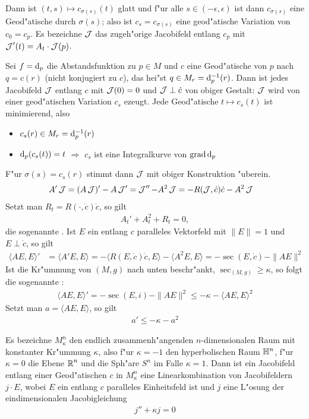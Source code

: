 Dann ist $(t, s) \mapsto c_{\sigma(s)}(t)$ glatt und f"ur alle $s \in (-\epsilon, \epsilon)$ ist dann $c_{\sigma(s)}$ eine Geod"atische durch $\sigma(s)$; also ist $c_s = c_{\sigma(s)}$ eine geod"atische Variation von $c_0 = c_p$.
Es bezeichne $\operatorname{\mathcal{J}}$ das zugeh"orige Jacobifeld entlang $c_p$ mit $\operatorname{\mathcal{J}}'(t) = A_t \cdot \operatorname{\mathcal{J}}(p)$.

Sei $f = \mathrm{d}_p$ die Abstandsfunktion zu $p \in M$ und $c$ eine Geod"atische von $p$ nach $q = c(r)$ (nicht konjugiert zu $c$), das hei"st $q \in M_r = \mathrm{d}_p^{-1}(r)$.
Dann ist jedes Jacobifeld $\operatorname{\mathcal{J}}$ entlang $c$ mit $\operatorname{\mathcal{J}}(0) = 0$ und $\operatorname{\mathcal{J}} \perp \dot c$ von obiger Gestalt:
$\operatorname{\mathcal{J}}$ wird von einer geod"atischen Variation $c_s$ ezeugt.
Jede Geod"atische $t \mapsto c_s(t)$ ist minimierend, also
\begin{itemize}
\item $c_s(r) \in M_r = \mathrm{d}_p^{-1}(r)$
\item $\mathrm{d}_p(c_s(t)) = t$ $\Rightarrow$ $c_s$ ist eine Integralkurve von $\operatorname{grad} \mathrm{d}_p$
\end{itemize}
F"ur $\sigma(s) = c_s(r)$ stimmt dann $\operatorname{\mathcal{J}}$ mit obiger Konstruktion "uberein.
\begin{align*}
  A'\operatorname{\mathcal{J}} &= (A \operatorname{\mathcal{J}})' - A \operatorname{\mathcal{J}}' = \operatorname{\mathcal{J}}'' - A^2\operatorname{\mathcal{J}} = -R(\operatorname{\mathcal{J}}, \dot c) \dot c - A^2 \operatorname{\mathcal{J}}
\end{align*}
Setzt man $R_t = R(\cdot, \dot c)\dot c$, so gilt
\begin{align*}
  A_t' + A_t^2 + R_t = 0,
\end{align*}
die sogenannte . Ist $E$ ein entlang $c$ paralleles Vektorfeld mit $\| E \| = 1$ und $E \perp \dot c$, so gilt
\begin{align*}
  \langle AE, E \rangle' &= \langle A'E, E \rangle = -\langle R(E, \dot c)\dot c, E \rangle - \langle A^2E, E \rangle = -\sec(E, \dot c) - \|AE\|^2
\end{align*}
Ist die Kr"ummung  von $(M,g)$ nach unten beschr"ankt, $\sec_{(M,g)} \ge \kappa$, so folgt die sogenannte :
\begin{align*}
  \langle AE, E \rangle' = -\sec(E,i) - \|AE\|^2 \le -\kappa - \langle AE, E \rangle^2
\end{align*}
Setzt man $a = \langle AE, E \rangle$, so gilt
\begin{align*}
  a' \le -\kappa - a^2
\end{align*}

\begin{emptythm}
  Es bezeichne $M_\kappa^n$ den endlich zusammenh"angenden $n$-dimensionalen Raum  mit konstanter Kr"ummung $\kappa$, also f"ur $\kappa = -1$ den hyperbolischen Raum $\mathbb{H}^n$, f"ur $\kappa = 0$ die Ebene $\operatorname{\mathbb{R}}^n$ und die Sph"are $S^n$ im Falle $\kappa = 1$.
  Dann ist ein Jacobifeld entlang einer Geod"atischen $c$ in $M_\kappa^n$ eine Linearkombination von Jacobifeldern $j \cdot E$, wobei $E$ ein entlang $c$ paralleles Einheitsfeld ist und $j$ eine L"osung der eindimensionalen Jacobigleichung
  \begin{align*}
    j'' + \kappa j = 0
  \end{align*}\end{emptythm}

